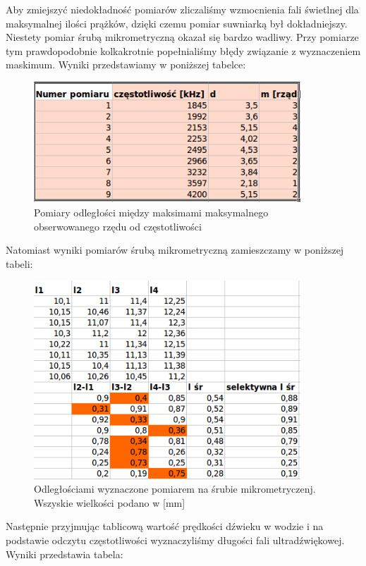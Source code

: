 \documentclass[a4paper,12pt]{article}
\begin{document}
Aby zmiejszyć niedokładność pomiarów zliczaliśmy wzmocnienia fali świetlnej dla maksymalnej ilości prążków, dzięki czemu pomiar suwniarką był dokładniejszy. Niestety pomiar śrubą mikrometryczną okazał się bardzo wadliwy. Przy pomiarze tym prawdopodobnie kolkakrotnie popełnialiśmy błędy związanie z wyznaczeniem maskimum. Wyniki przedstawiamy w poniższej tabelce: 


\begin{figure} [H]
  \begin{center}
    \includegraphics[width = 10cm]{tab1.png}
    \caption{Pomiary odległości między maksimami maksymalnego obserwowanego rzędu od częstotliwości}
  \end{center}
\end{figure}

Natomiast wyniki pomiarów śrubą mikrometryczną zamieszczamy w poniższej tabeli: 

\begin{figure} [H]
  \begin{center}
    \includegraphics[width = 10cm]{tab2.png}
    \caption{Odległościami wyznaczone pomiarem na śrubie mikrometryczenj. Wszyskie wielkości podano w [mm]}
  \end{center}
\end{figure}


Następnie przyjmując tablicową wartość prędkości dźwieku w wodzie i na podstawie odczytu częstotliwości wyznaczyliśmy długości fali ultradźwiękowej. Wyniki przedstawia tabela: 
\end{document}
